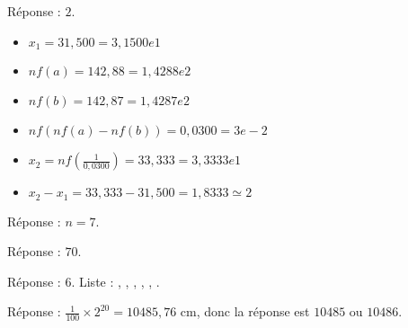 \documentclass[class=report,crop=false, 12pt]{standalone}
\begin{document}
\begin{enigme}

Réponse : $2$.

\begin{itemize}
  \item $x_1 = 31,500 = 3,1500e1$
  \item $nf(a)=142,88 = 1,4288e2$
  \item $nf(b) = 142,87 = 1,4287e2$
  \item $nf(nf(a)-nf(b)) = 0,0300 = 3e-2$
  \item $x_2 = nf(\frac{1}{0,0300}) = 33,333 = 3,3333e1$
  \item $x_2-x_1 = 33,333-31,500 = 1,8333 \simeq 2$ 
\end{itemize}


\end{enigme}


\begin{enigme}[Si ... alors ...]
Réponse : $n=7$.
\end{enigme}




\begin{enigme}[Boucles I]

Réponse : $70$.

\end{enigme}



\begin{enigme}

Réponse : 6. Liste : , , , , , .

\end{enigme}


\begin{enigme}[Puissances de 2]

Réponse : $\frac{1}{100} \times 2^{20} = 10485,76$ cm, donc la réponse est $10485$ ou $10486$.

\end{enigme}


\end{document}
